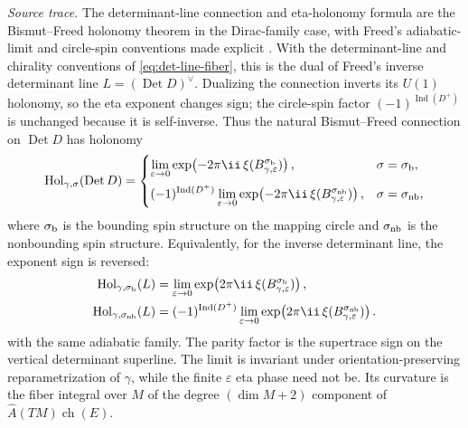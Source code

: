 \begin{quotedtheorem}
\label{qthm:bismut-freed-holonomy}
\emph{Source trace.}  The determinant-line connection and eta-holonomy
formula are the Bismut--Freed holonomy theorem in the Dirac-family case,
with Freed's adiabatic-limit and circle-spin conventions made explicit
\cite{BismutFreed1986,Freed1995DeterminantRevisited}.
With the determinant-line and chirality conventions of
\eqref{eq:det-line-fiber}, this is the dual of Freed's inverse determinant
line \(L=(\operatorname{Det}D)^\vee\).  Dualizing the connection inverts its
\(U(1)\) holonomy, so the eta exponent changes sign; the circle-spin factor
\((-1)^{\operatorname{Ind}(D^+)}\) is unchanged because it is self-inverse.
Thus the natural Bismut--Freed connection on \(\operatorname{Det}D\) has
holonomy
\begin{equation}
  \operatorname{Hol}_{\gamma,\sigma}(\operatorname{Det}D)
  =
  \begin{cases}
  \displaystyle
  \lim_{\varepsilon\to0}
  \exp\!\left(-2\pi\ii\,\xi(B_{\gamma,\varepsilon}^{\sigma_{\rm b}})\right),
  & \sigma=\sigma_{\rm b},\\[3mm]
  \displaystyle
  (-1)^{\operatorname{Ind}(D^+)}
  \lim_{\varepsilon\to0}
  \exp\!\left(-2\pi\ii\,\xi(B_{\gamma,\varepsilon}^{\sigma_{\rm nb}})\right),
  & \sigma=\sigma_{\rm nb},
  \end{cases}
  \label{eq:bismut-freed-holonomy}
\end{equation}
where \(\sigma_{\rm b}\) is the bounding spin structure on the mapping
circle and \(\sigma_{\rm nb}\) is the nonbounding spin structure.
Equivalently, for the inverse determinant line, the exponent sign is
reversed:
\begin{equation}
\begin{aligned}
  \operatorname{Hol}_{\gamma,\sigma_{\rm b}}(L)
  &=
  \lim_{\varepsilon\to0}
  \exp\!\left(2\pi\ii\,\xi(B_{\gamma,\varepsilon}^{\sigma_{\rm b}})\right),
  \\
  \operatorname{Hol}_{\gamma,\sigma_{\rm nb}}(L)
  &=
  (-1)^{\operatorname{Ind}(D^+)}
  \lim_{\varepsilon\to0}
  \exp\!\left(2\pi\ii\,\xi(B_{\gamma,\varepsilon}^{\sigma_{\rm nb}})\right).
\end{aligned}
  \label{eq:bismut-freed-inverse-holonomy}
\end{equation}
with the same adiabatic family.  The parity factor is the supertrace sign on
the vertical determinant superline.  The limit is invariant under
orientation-preserving reparametrization of \(\gamma\), while the finite
\(\varepsilon\) eta phase need not be.
Its curvature is the fiber integral over \(M\) of the degree
\((\dim M+2)\) component of
\(\widehat A(TM)\operatorname{ch}(E)\).
\end{quotedtheorem}

